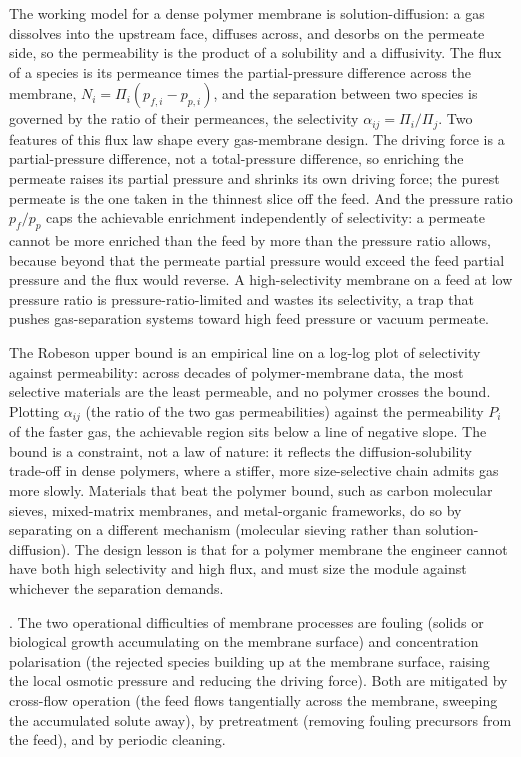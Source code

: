 The working model for a dense polymer membrane is solution-diffusion: a
gas dissolves into the upstream face, diffuses across, and desorbs on
the permeate side, so the permeability is the product of a solubility
and a diffusivity. The flux of a species is its permeance times the
partial-pressure difference across the membrane, $N_i = \Pi_i (p_{f,i} -
p_{p,i})$, and the separation between two species is governed by the
ratio of their permeances, the selectivity $\alpha_{ij} = \Pi_i/\Pi_j$.
Two features of this flux law shape every gas-membrane design. The
driving force is a partial-pressure difference, not a total-pressure
difference, so enriching the permeate raises its partial pressure and
shrinks its own driving force; the purest permeate is the one taken in
the thinnest slice off the feed. And the pressure ratio
$p_f/p_p$ caps the achievable enrichment independently of selectivity:
a permeate cannot be more enriched than the feed by more than the
pressure ratio allows, because beyond that the permeate partial
pressure would exceed the feed partial pressure and the flux would
reverse. A high-selectivity membrane on a feed at low pressure ratio is
pressure-ratio-limited and wastes its selectivity, a trap that pushes
gas-separation systems toward high feed pressure or vacuum permeate.

\begin{mastery}
The Robeson upper bound is an empirical line on a log-log plot of
selectivity against permeability: across decades of polymer-membrane
data, the most selective materials are the least permeable, and no
polymer crosses the bound. Plotting $\alpha_{ij}$ (the ratio of the two
gas permeabilities) against the permeability $P_i$ of the faster gas,
the achievable region sits below a line of negative slope. The bound is
a constraint, not a law of nature: it reflects the diffusion-solubility
trade-off in dense polymers, where a stiffer, more size-selective chain
admits gas more slowly. Materials that beat the polymer bound, such as
carbon molecular sieves, mixed-matrix membranes, and metal-organic
frameworks, do so by separating on a different mechanism (molecular
sieving rather than solution-diffusion). The design lesson is that for
a polymer membrane the engineer cannot have both high selectivity and
high flux, and must size the module against whichever the separation
demands.
\end{mastery}

. The two
operational difficulties of membrane processes are fouling (solids
or biological growth accumulating on the membrane surface) and
concentration polarisation (the rejected species building up at the
membrane surface, raising the local osmotic pressure and reducing
the driving force). Both are mitigated by cross-flow operation (the
feed flows tangentially across the membrane, sweeping the
accumulated solute away), by pretreatment (removing fouling
precursors from the feed), and by periodic cleaning.

